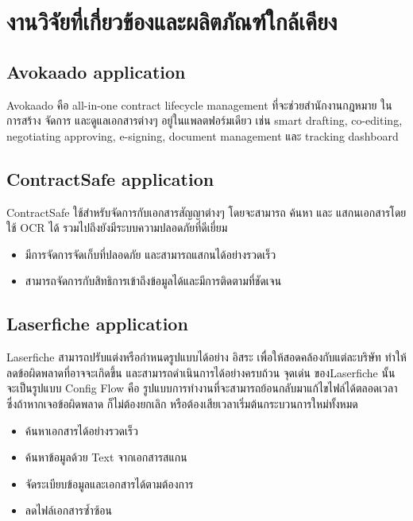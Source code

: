 \documentclass[12pt,oneside,openright,a4paper]{cpe-thai-project}
\begin{document}
\section{งานวิจัยที่เกี่ยวข้องและผลิตภัณฑ์ใกล้เคียง}
\subsection{Avokaado application}
\hspace*{1cm} Avokaado คือ all-in-one contract lifecycle management ที่จะช่วยสำนักงานกฎหมาย ในการสร้าง จัดการ และดูแลเอกสารต่างๆ อยู่ในแพลตฟอร์มเดียว เช่น smart drafting, co-editing, negotiating approving, e-signing, document management และ tracking dashboard
\subsection{ContractSafe application}
\hspace*{1cm} ContractSafe ใช้สำหรับจัดการกับเอกสารสัญญาต่างๆ โดยจะสามารถ ค้นหา และ แสกนเอกสารโดยใช้ OCR ได้ รวมไปถึงยังมีระบบความปลอดภัยที่ดีเยี่ยม \\
\begin{itemize}
  \item มีการจัดการจัดเก็บที่ปลอดภัย และสามารถแสกนได้อย่างรวดเร็ว	
  \item สามารถจัดการกับสิทธิการเข้าถึงข้อมูลได้และมีการติดตามที่ชัดเจน
\end{itemize}

\subsection{Laserfiche application}
\hspace*{1cm} Laserfiche สามารถปรับแต่งหรือกำหนดรูปแบบได้อย่าง อิสระ เพื่อให้สอดคล้องกับแต่ละบริษัท ทำให้ลดข้อผิดพลาดที่อาจจะเกิดขึ้น และสามารถดำเนินการได้อย่างครบถ้วน จุดเด่น ของLaserfiche นั้น จะเป็นรูปแบบ Config Flow คือ รูปแบบการทำงานที่จะสามารถย้อนกลับมาแก้ไขไฟล์ได้ตลอดเวลา ซึ่งถ้าหากเจอข้อผิดพลาด ก็ไม่ต้องยกเลิก หรือต้องเสียเวลาเริ่มต้นกระบวนการใหม่ทั้งหมด \\
\begin{itemize}
  \item ค้นหาเอกสารได้อย่างรวดเร็ว
  \item ค้นหาข้อมูลด้วย Text จากเอกสารสแกน
  \item จัดระเบียบข้อมูลและเอกสารได้ตามต้องการ
  \item ลดไฟล์เอกสารซ้ำซ้อน
\end{itemize}
\end{document}
